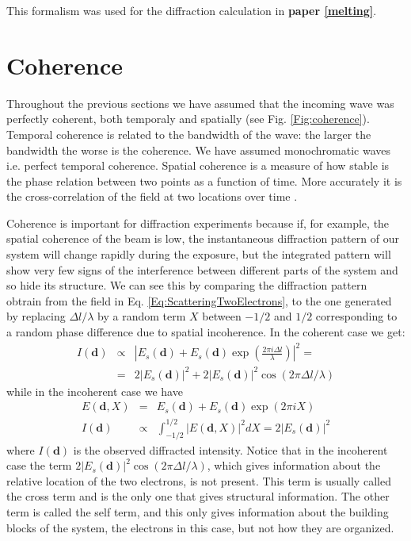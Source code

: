 This formalism was used for the diffraction calculation in {\bf paper \ref{melting}}.

\section{Coherence}\label{coherence}

Throughout the previous sections we have assumed that the incoming wave was
perfectly coherent, both temporaly and spatially (see Fig. \ref{Fig:coherence}). Temporal coherence is related
to the bandwidth of the wave: the larger the bandwidth the worse is the
coherence. We have assumed monochromatic waves i.e. perfect temporal
coherence. Spatial coherence is a measure of how stable is the phase relation between
two points as a function of time. More accurately it is the cross-correlation of the field at two locations over time \cite{Attwood2007Soft}. 

Coherence is important for diffraction experiments \cite{HauRiege2008Effect,Whitehead2009Diffractive} because if, for example, the
spatial coherence of the beam is low, the instantaneous diffraction pattern of
our system will change rapidly during the exposure, but the integrated pattern
will show very few signs of the interference between different parts of the
system and so hide its structure. We can see this by comparing the diffraction
pattern obtrain from the field in Eq. \ref{Eq:ScatteringTwoElectrons}, to the
one generated by replacing $\Delta l/\lambda$ by a random term $X$
between $-1/2$ and $1/2$ corresponding to a random phase difference due to
spatial incoherence. In the coherent case we get:
\begin{eqnarray}
  I(\mathbf d)  & \propto & |E_s(\mathbf d) + E_s(\mathbf d) \exp(\frac{2 \pi i \Delta
    l}{\lambda})|^2  = \nonumber \\
 & = & 2 |E_s(\mathbf d)|^2 + 2 |E_s(\mathbf d)|^2
  \cos(2 \pi \Delta l / \lambda)
\end{eqnarray}
 while in the incoherent case we have
\begin{eqnarray}
 E(\mathbf d,X) & = &  E_s(\mathbf d) + E_s(\mathbf d) \exp(2 \pi i X) \nonumber
 \\
I(\mathbf d)  & \propto & \int_{-1/2}^{1/2} |E(\mathbf d,X)|^2 dX = 2 |E_s(\mathbf d)|^2
\end{eqnarray}
where $I(\mathbf d)$ is the observed diffracted intensity. Notice that in the
incoherent case the term $2 |E_s(\mathbf d)|^2 \cos(2 \pi \Delta l / \lambda)$,
which gives information about the relative location of the two electrons, is not
present. This term is usually called the cross term and is the only one that
gives structural information. The other term is called the self term, and this only gives
information about the building blocks of the system, the electrons in this case,
but not how they are organized.

